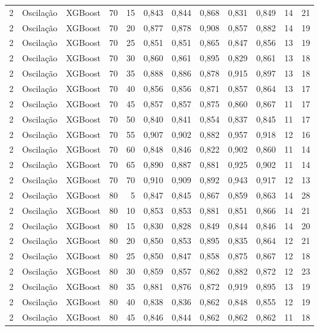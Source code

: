 \begin{longtable}{@{}rllrrrrrrrrr@{}}
2 & Oscilação & XGBoost & 70 & 15 & 0,843 & 0,844 & 0,868 & 0,831 & 0,849 & 14 & 21 \\
2 & Oscilação & XGBoost & 70 & 20 & 0,877 & 0,878 & 0,908 & 0,857 & 0,882 & 14 & 19 \\
2 & Oscilação & XGBoost & 70 & 25 & 0,851 & 0,851 & 0,865 & 0,847 & 0,856 & 13 & 19 \\
2 & Oscilação & XGBoost & 70 & 30 & 0,860 & 0,861 & 0,895 & 0,829 & 0,861 & 13 & 18 \\
2 & Oscilação & XGBoost & 70 & 35 & 0,888 & 0,886 & 0,878 & 0,915 & 0,897 & 13 & 18 \\
2 & Oscilação & XGBoost & 70 & 40 & 0,856 & 0,856 & 0,871 & 0,857 & 0,864 & 13 & 17 \\
2 & Oscilação & XGBoost & 70 & 45 & 0,857 & 0,857 & 0,875 & 0,860 & 0,867 & 11 & 17 \\
2 & Oscilação & XGBoost & 70 & 50 & 0,840 & 0,841 & 0,854 & 0,837 & 0,845 & 11 & 17 \\
2 & Oscilação & XGBoost & 70 & 55 & 0,907 & 0,902 & 0,882 & 0,957 & 0,918 & 12 & 16 \\
2 & Oscilação & XGBoost & 70 & 60 & 0,848 & 0,846 & 0,822 & 0,902 & 0,860 & 11 & 14 \\
2 & Oscilação & XGBoost & 70 & 65 & 0,890 & 0,887 & 0,881 & 0,925 & 0,902 & 11 & 14 \\
2 & Oscilação & XGBoost & 70 & 70 & 0,910 & 0,909 & 0,892 & 0,943 & 0,917 & 12 & 13 \\
2 & Oscilação & XGBoost & 80 & 5 & 0,847 & 0,845 & 0,867 & 0,859 & 0,863 & 14 & 28 \\
2 & Oscilação & XGBoost & 80 & 10 & 0,853 & 0,853 & 0,881 & 0,851 & 0,866 & 14 & 21 \\
2 & Oscilação & XGBoost & 80 & 15 & 0,830 & 0,828 & 0,849 & 0,844 & 0,846 & 14 & 20 \\
2 & Oscilação & XGBoost & 80 & 20 & 0,850 & 0,853 & 0,895 & 0,835 & 0,864 & 12 & 21 \\
2 & Oscilação & XGBoost & 80 & 25 & 0,850 & 0,847 & 0,858 & 0,875 & 0,867 & 12 & 18 \\
2 & Oscilação & XGBoost & 80 & 30 & 0,859 & 0,857 & 0,862 & 0,882 & 0,872 & 12 & 23 \\
2 & Oscilação & XGBoost & 80 & 35 & 0,881 & 0,876 & 0,872 & 0,919 & 0,895 & 13 & 19 \\
2 & Oscilação & XGBoost & 80 & 40 & 0,838 & 0,836 & 0,862 & 0,848 & 0,855 & 12 & 19 \\
2 & Oscilação & XGBoost & 80 & 45 & 0,846 & 0,844 & 0,862 & 0,862 & 0,862 & 11 & 18 \\

\end{longtable}
